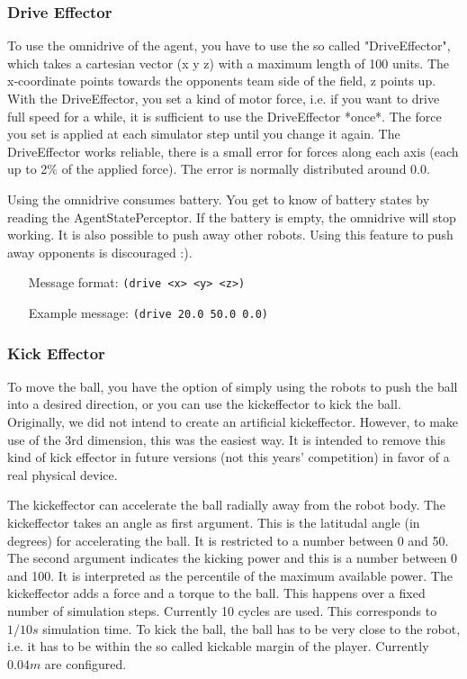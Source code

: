 \subsubsection{Drive Effector}
\label{sec:driveeffector}
To use the omnidrive of the agent, you have to use the so called
"DriveEffector", which takes a cartesian vector (x y z) with a maximum
length of 100 units. The x-coordinate points towards the opponents
team side of the field, z points up. With the DriveEffector, you set a
kind of motor force, i.e. if you want to drive full speed for a while,
it is sufficient to use the DriveEffector *once*. The force you set is
applied at each simulator step until you change it again. The
DriveEffector works reliable, there is a small error for forces along
each axis (each up to 2\% of the applied force). The error is normally
distributed around $0.0$.

Using the omnidrive consumes battery. You get to know of battery
states by reading the AgentStatePerceptor. If the battery is empty,
the omnidrive will stop working. It is also possible to push away
other robots. Using this feature to push away opponents is discouraged
:).

\begin{itemize}
	\item[Message format:] \texttt{(drive <x> <y> <z>)}
	\item[Example message:] \texttt{(drive 20.0 50.0 0.0)}
\end{itemize}



\subsubsection{Kick Effector}
\label{sec:kickeffector}
To move the ball, you have the option of simply using the robots to
push the ball into a desired direction, or you can use the
kickeffector to kick the ball. Originally, we did not intend to create
an artificial kickeffector. However, to make use of the 3rd dimension,
this was the easiest way. It is intended to remove this kind of kick
effector in future versions (not this years' competition) in favor of
a real physical device.

The kickeffector can accelerate the ball radially away from the robot
body. The kickeffector takes an angle as first argument. This is the
latitudal angle (in degrees) for accelerating the ball. It is
restricted to a number between 0 and 50. The second argument indicates
the kicking power and this is a number between 0 and 100. It is
interpreted as the percentile of the maximum available power. The
kickeffector adds a force and a torque to the ball. This happens over
a fixed number of simulation steps. Currently 10 cycles are used. This
corresponds to $1/10s$ simulation time. To kick the ball, the ball has
to be very close to the robot, i.e. it has to be within the so called
kickable margin of the player. Currently $0.04m$ are configured.

